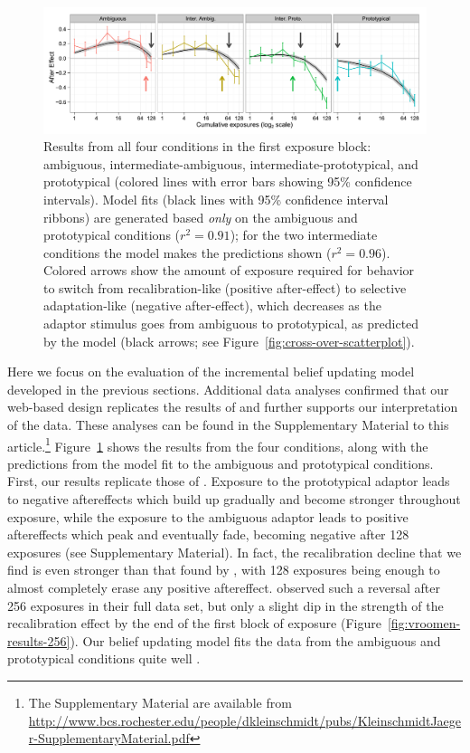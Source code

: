 \begin{figure}[!h]
  \centering
  \includegraphics[width=\textwidth]{intr-model-ae-firstblock-xover-arrows.pdf}
  \caption{Results from all four conditions in the first exposure block: ambiguous, intermediate-ambiguous, intermediate-prototypical, and prototypical (colored lines with error bars showing 95\% confidence intervals). Model fits (black lines with 95\% confidence interval ribbons) are generated based \emph{only} on the ambiguous and prototypical conditions ($r^2=0.91$); for the two intermediate conditions the model makes the predictions shown ($r^2=0.96$).  Colored arrows show the amount of exposure required for behavior to switch from recalibration-like (positive after-effect) to selective adaptation-like (negative after-effect), which decreases as the adaptor stimulus goes from ambiguous to prototypical, as predicted by the model (black arrows; see Figure~\ref{fig:cross-over-scatterplot}).}
  \label{fig:intr-results-fits}
\end{figure}

Here we focus on the evaluation of the incremental belief updating model developed in the previous sections. Additional data analyses confirmed that our web-based design replicates the results of \textcite{Vroomen2007} and further supports our interpretation of the data. These analyses can be found in the Supplementary Material to this article.\footnote{The Supplementary Material are available from \url{http://www.bcs.rochester.edu/people/dkleinschmidt/pubs/KleinschmidtJaeger-SupplementaryMaterial.pdf}}
Figure~\ref{fig:intr-results-fits} shows the results from the four conditions, along with the predictions from the model fit to the ambiguous and prototypical conditions.  First, our results replicate those of \textcite{Vroomen2007}.  Exposure to the prototypical adaptor leads to negative aftereffects which build up gradually and become stronger throughout exposure, while the exposure to the ambiguous adaptor leads to positive aftereffects which peak and eventually fade, becoming negative after 128 exposures (see Supplementary Material).
In fact, the recalibration decline that we find is even stronger than that found by \textcite{Vroomen2007}, with 128 exposures being enough to almost completely erase any positive aftereffect.  \textcite{Vroomen2007} observed such a reversal after 256 exposures in their full data set, but only a slight dip in the strength of the recalibration effect by the end of the first block of exposure (Figure~\ref{fig:vroomen-results-256}).
Our belief updating model fits the data from the ambiguous and prototypical conditions quite well \autocite[$r^2=0.91$ overall, vs. $r^2=0.93$ when fit to][]{Vroomen2007}.

